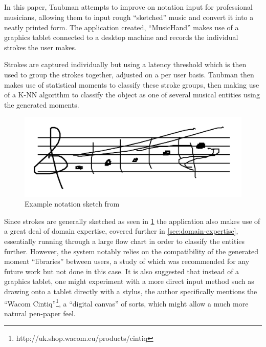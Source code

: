 \subsection{\cite{taubman2005musichand}}
\label{sec:domain-knowledge-taubman}
In this paper, Taubman attempts to improve on notation input for professional musicians, allowing them to input rough ``sketched'' music and convert it into a neatly printed form. The application created, ``MusicHand'' makes use of a graphics tablet connected to a desktop machine and records the individual strokes the user makes.

Strokes are captured individually but using a latency threshold which is then used to group the strokes together, adjusted on a per user basis. Taubman then makes use of statistical moments  to classify these stroke groups, then making use of a K-NN algorithm to classify the object as one of several musical entities using the generated moments.

\begin{figure}[H]
  \includegraphics[width=\linewidth/2]{gfx/prior-research/taubman-sketch.png}
  \centering
  \caption{Example notation sketch from \cite{taubman2005musichand}}
  \label{fig:taubman-sketch}
\end{figure}

Since strokes are generally sketched as seen in \cref{fig:taubman-sketch} the application also makes use of a great deal of domain expertise, covered further in \cref{sec:domain-expertise}, essentially running through a large flow chart in order to classify the entities further. However, the system notably relies on the compatibility of the generated moment ``libraries'' between users, a study of which was recommended for any future work but not done in this case. It is also suggested that instead of a graphics tablet, one might experiment with a more direct input method such as drawing onto a tablet directly with a stylus, the author specifically mentions the ``Wacom Cintiq''\footnote{http://uk.shop.wacom.eu/products/cintiq}, a ``digital canvas'' of sorts, which might allow a much more natural pen-paper feel.

